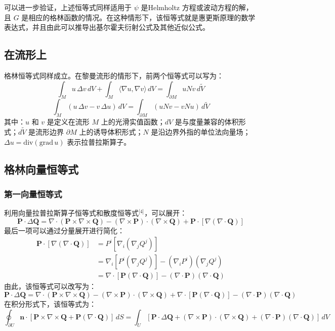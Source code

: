 可以进一步验证，上述恒等式同样适用于 $\psi$ 是Helmholtz 方程或波动方程的解，且 $G$ 是相应的格林函数的情况。在这种情形下，该恒等式就是惠更斯原理的数学表达式，并且由此可以推导出基尔霍夫衍射公式及其他近似公式。
\subsection{在流形上}
格林恒等式同样成立。在黎曼流形的情形下，前两个恒等式可以写为：
$$
\int_{M} u\,\Delta v\, dV + \int_{M} \langle \nabla u, \nabla v \rangle\, dV
= \int_{\partial M} u N v\, d\widetilde{V}~
$$
$$
\int_{M} \left(u\,\Delta v - v\,\Delta u\right)\, dV
= \int_{\partial M} \left(u N v - v N u\right)\, d\widetilde{V}~
$$
其中：$u$ 和 $v$ 是定义在流形 $M$ 上的光滑实值函数；$dV$ 是与度量兼容的体积形式；$d\widetilde{V}$ 是流形边界 $\partial M$ 上的诱导体积形式；$N$ 是沿边界外指的单位法向量场；$\Delta u = \mathrm{div}(\mathrm{grad}\,u)$ 表示拉普拉斯算子。
\subsection{格林向量恒等式}
\subsubsection{第一向量恒等式}
利用向量拉普拉斯算子恒等式和散度恒等式\(^\text{[4]}\)，可以展开：
$$
\mathbf{P} \cdot \Delta \mathbf{Q}
= \nabla \cdot (\mathbf{P} \times \nabla \times \mathbf{Q})
- (\nabla \times \mathbf{P}) \cdot (\nabla \times \mathbf{Q})
+ \mathbf{P} \cdot [\nabla (\nabla \cdot \mathbf{Q})]~
$$
最后一项可以通过分量展开进行简化：
$$
\begin{aligned}
\mathbf{P} \cdot [\nabla (\nabla \cdot \mathbf{Q})]
&= P^i[\nabla_i(\nabla_j Q^j)] \\
&= \nabla_i[P^i(\nabla_j Q^j)] - (\nabla_i P^i)(\nabla_j Q^j) \\
&= \nabla \cdot [\mathbf{P}(\nabla \cdot \mathbf{Q})] - (\nabla \cdot \mathbf{P})(\nabla \cdot \mathbf{Q})
\end{aligned}~
$$
由此，该恒等式可以改写为：
$$
\mathbf{P} \cdot \Delta \mathbf{Q}
= \nabla \cdot (\mathbf{P} \times \nabla \times \mathbf{Q})
- (\nabla \times \mathbf{P}) \cdot (\nabla \times \mathbf{Q})
+ \nabla \cdot [\mathbf{P}(\nabla \cdot \mathbf{Q})]
- (\nabla \cdot \mathbf{P})(\nabla \cdot \mathbf{Q})~
$$
在积分形式下，该恒等式为：
$$
\oint_{\partial U} 
\mathbf{n} \cdot 
[\mathbf{P} \times \nabla \times \mathbf{Q} 
+ \mathbf{P} (\nabla \cdot \mathbf{Q})]\, dS
= 
\int_{U} 
[
\mathbf{P} \cdot \Delta \mathbf{Q} 
+ (\nabla \times \mathbf{P}) \cdot (\nabla \times \mathbf{Q})
+ (\nabla \cdot \mathbf{P})(\nabla \cdot \mathbf{Q})
]\, dV~
$$
